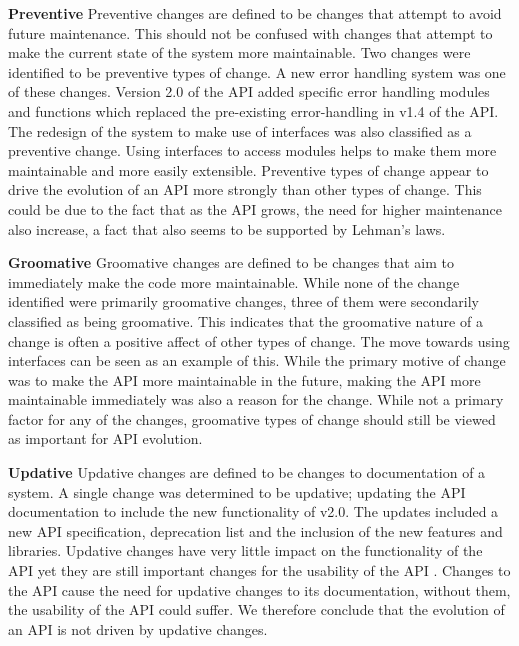 \documentclass{sig-alternate}
\begin{document}
\smallskip \noindent
\textbf{Preventive  }
Preventive changes are defined to be changes that attempt to avoid future maintenance. This should not be confused with changes that attempt to make the current state of the system more maintainable.
Two changes were identified to be preventive types of change. A new error handling system was one of these changes. Version 2.0 of the API added specific error handling modules and functions which replaced the pre-existing error-handling in v1.4 of the API. The redesign of the system to make use of interfaces was also classified as a preventive change. Using interfaces to access modules helps to make them more maintainable and more easily extensible.
Preventive types of change appear to drive the evolution of an API more strongly than other types of change. This could be due to the fact that as the API grows, the need for higher maintenance also increase, a fact that also seems to be supported by Lehman's laws.

\smallskip \noindent
\textbf{Groomative  }
Groomative changes are defined to be changes that aim to immediately make the code more maintainable.
While none of the change identified were primarily groomative changes, three of them were secondarily classified as being groomative. This indicates that the groomative nature of a change is often a positive affect of other types of change. The move towards using interfaces can be seen as an example of this. While the primary motive of change was to make the API more maintainable in the future, making the API more maintainable immediately was also a reason for the change.
While not a primary factor for any of the changes, groomative types of change should still be viewed as important for API evolution.

\smallskip \noindent
\textbf{Updative  }
Updative changes are defined to be changes to documentation of a system.
A single change was determined to be updative; updating the API documentation to include the new functionality of v2.0. The updates included a new API specification, deprecation list and the inclusion of the new features and libraries.
Updative changes have very little impact on the functionality of the API yet they are still important changes for the usability of the API \cite{shi2011empirical}. Changes to the API cause the need for updative changes to its documentation, without them, the usability of the API could suffer. We therefore conclude that the evolution of an API is not driven by updative changes.
\end{document}
